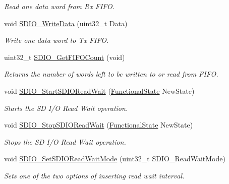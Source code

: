 \begin{DoxyCompactItemize}
\begin{DoxyCompactList}\small\item\em Read one data word from Rx F\+I\+FO. \end{DoxyCompactList}\item 
void \hyperlink{group___s_d_i_o___private___functions_ga361008b5252aa33b5f2b5823ee3d7240}{S\+D\+I\+O\+\_\+\+Write\+Data} (uint32\+\_\+t Data)
\begin{DoxyCompactList}\small\item\em Write one data word to Tx F\+I\+FO. \end{DoxyCompactList}\item 
uint32\+\_\+t \hyperlink{group___s_d_i_o___private___functions_ga9a3343983a2d68b5164a1c89797d2dd6}{S\+D\+I\+O\+\_\+\+Get\+F\+I\+F\+O\+Count} (void)
\begin{DoxyCompactList}\small\item\em Returns the number of words left to be written to or read from F\+I\+FO. \end{DoxyCompactList}\item 
void \hyperlink{group___s_d_i_o___private___functions_gac88f914d9a68a83abc2265ec8a7b79fc}{S\+D\+I\+O\+\_\+\+Start\+S\+D\+I\+O\+Read\+Wait} (\hyperlink{group___exported__types_gac9a7e9a35d2513ec15c3b537aaa4fba1}{Functional\+State} New\+State)
\begin{DoxyCompactList}\small\item\em Starts the SD I/O Read Wait operation. \end{DoxyCompactList}\item 
void \hyperlink{group___s_d_i_o___private___functions_gaca6b25eb2debb73ac827c66f0ebcf837}{S\+D\+I\+O\+\_\+\+Stop\+S\+D\+I\+O\+Read\+Wait} (\hyperlink{group___exported__types_gac9a7e9a35d2513ec15c3b537aaa4fba1}{Functional\+State} New\+State)
\begin{DoxyCompactList}\small\item\em Stops the SD I/O Read Wait operation. \end{DoxyCompactList}\item 
void \hyperlink{group___s_d_i_o___private___functions_ga2baac4ea1bb6c2d94345d2712604338a}{S\+D\+I\+O\+\_\+\+Set\+S\+D\+I\+O\+Read\+Wait\+Mode} (uint32\+\_\+t S\+D\+I\+O\+\_\+\+Read\+Wait\+Mode)
\begin{DoxyCompactList}\small\item\em Sets one of the two options of inserting read wait interval. \end{DoxyCompactList}\item 

\end{DoxyCompactItemize}

